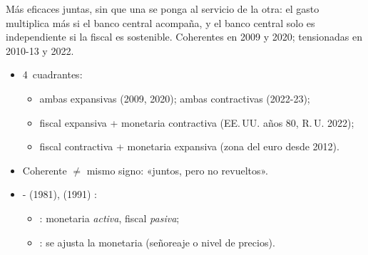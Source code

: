 \documentclass{article}
\begin{document}
\begin{columnas}
\begin{ideaclave}
Más eficaces juntas, sin que una se ponga al servicio de la otra: el gasto multiplica más si el banco central acompaña, y el banco central solo es independiente si la fiscal es sostenible. Coherentes en 2009 y 2020; tensionadas en 2010-13 y 2022.
\end{ideaclave}

\begin{itemize}
\item 4~cuadrantes:
  \begin{itemize}
  \item ambas expansivas (2009, 2020); ambas contractivas (2022-23);
  \item fiscal expansiva + monetaria contractiva (EE.\,UU. años 80, R.\,U. 2022);
  \item fiscal contractiva + monetaria expansiva (zona del euro desde 2012).
  \end{itemize}
\item Coherente $\neq$ mismo signo: «juntos, pero no revueltos».
\end{itemize}
\begin{itemize}
\item {}- (1981),  (1991) :
  \begin{itemize}
  \item {}: monetaria \emph{activa}, fiscal \emph{pasiva};
  \item {}: se ajusta la monetaria (señoreaje o nivel de precios).
  \end{itemize}
\end{itemize}


\end{columnas}
\end{document}
